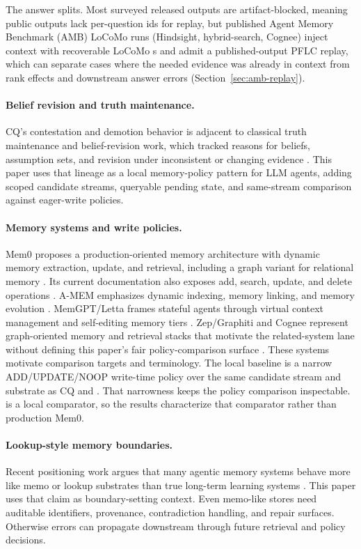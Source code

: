 The answer splits. Most surveyed released outputs are artifact-blocked, meaning
public outputs lack per-question ids for replay, but published Agent Memory
Benchmark (AMB) LoCoMo runs (Hindsight, hybrid-search, Cognee) inject context
with recoverable LoCoMo s and admit a published-output PFLC replay,
which can separate cases where the needed evidence was already in context from
rank effects and downstream answer errors (Section~\ref{sec:amb-replay}).

\paragraph{Belief revision and truth maintenance.}
CQ's contestation and demotion behavior is adjacent to classical truth
maintenance and belief-revision work, which tracked reasons for beliefs,
assumption sets, and revision under inconsistent or changing evidence
\cite{doyle1979truth,dekleer1986atms,agm1985theorychange}. This paper uses
that lineage as a local memory-policy pattern for LLM agents, adding scoped
candidate streams, queryable pending state, and same-stream comparison against
eager-write policies.

\paragraph{Memory systems and write policies.}
Mem0 proposes a production-oriented memory architecture with dynamic memory
extraction, update, and retrieval, including a graph variant for relational
memory \cite{mem02025}. Its current documentation also exposes add, search,
update, and delete operations \cite{mem0delete2026}. A-MEM emphasizes dynamic
indexing, memory linking, and memory evolution \cite{amem2025}. MemGPT/Letta
frames stateful agents through virtual context management and self-editing
memory tiers \cite{memgpt2024}.
Zep/Graphiti and Cognee represent graph-oriented memory and retrieval stacks
that motivate the related-system lane without defining this paper's fair
policy-comparison surface \cite{zep2025,cognee2025}. These systems motivate
comparison targets and terminology. The local \memzero{} baseline is a narrow
ADD/UPDATE/NOOP write-time policy over the same candidate stream and substrate
as CQ and . That narrowness keeps the policy comparison inspectable.
\memzero{} is a local comparator, so the results characterize that comparator
rather than production Mem0.

\paragraph{Lookup-style memory boundaries.}
Recent positioning work argues that many agentic memory systems behave more
like memo or lookup substrates than true long-term learning systems
\cite{memo2026}. This paper uses that claim as boundary-setting context.
Even memo-like stores need auditable identifiers, provenance, contradiction
handling, and repair surfaces. Otherwise errors can propagate downstream
through future retrieval and policy decisions.

